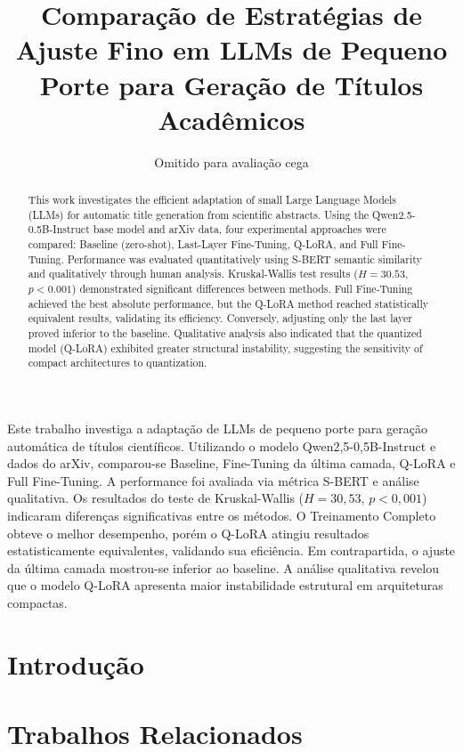 \documentclass[12pt]{article}
\title{Comparação de Estratégias de Ajuste Fino em LLMs de Pequeno Porte para Geração de Títulos Acadêmicos}
\author{Omitido para avaliação cega}
\begin{document}
\maketitle

\begin{resumo}
Este trabalho investiga a adaptação de LLMs de pequeno porte para geração automática de títulos científicos. Utilizando o modelo Qwen2,5-0,5B-Instruct e dados do arXiv, comparou-se Baseline, Fine-Tuning da última camada, Q-LoRA e Full Fine-Tuning. A performance foi avaliada via métrica S-BERT e análise qualitativa. Os resultados do teste de Kruskal-Wallis ($H=30,53$, $p<0,001$) indicaram diferenças significativas entre os métodos. O Treinamento Completo obteve o melhor desempenho, porém o Q-LoRA atingiu resultados estatisticamente equivalentes, validando sua eficiência. Em contrapartida, o ajuste da última camada mostrou-se inferior ao baseline. A análise qualitativa revelou que o modelo Q-LoRA apresenta maior instabilidade estrutural em arquiteturas compactas.
\end{resumo}

\begin{abstract}
This work investigates the efficient adaptation of small Large Language Models (LLMs) for automatic title generation from scientific abstracts. Using the Qwen2.5-0.5B-Instruct base model and arXiv data, four experimental approaches were compared: Baseline (zero-shot), Last-Layer Fine-Tuning, Q-LoRA, and Full Fine-Tuning. Performance was evaluated quantitatively using S-BERT semantic similarity and qualitatively through human analysis. Kruskal-Wallis test results ($H=30.53$, $p<0.001$) demonstrated significant differences between methods. Full Fine-Tuning achieved the best absolute performance, but the Q-LoRA method reached statistically equivalent results, validating its efficiency. Conversely, adjusting only the last layer proved inferior to the baseline. Qualitative analysis also indicated that the quantized model (Q-LoRA) exhibited greater structural instability, suggesting the sensitivity of compact architectures to quantization.
\end{abstract}

\section{Introdução}\label{sec:intro}



\section{Trabalhos Relacionados}\label{sec:related}
\end{document}
